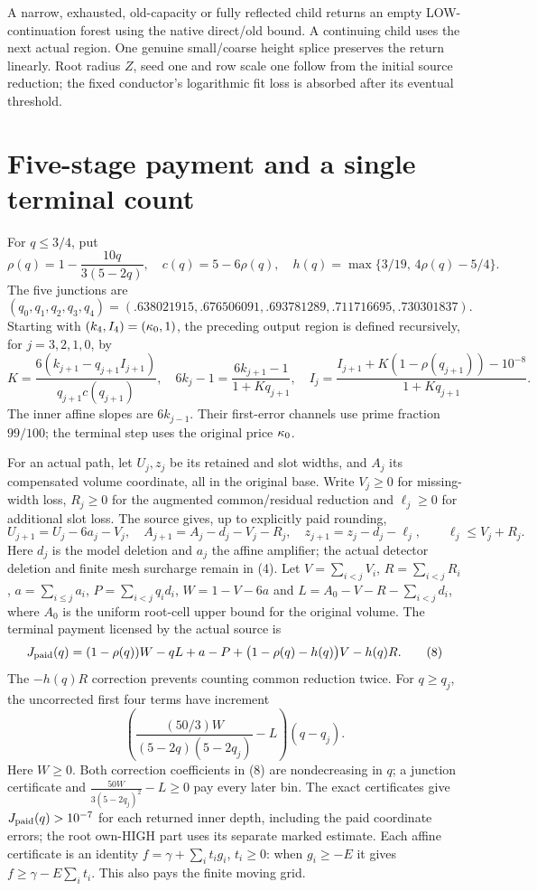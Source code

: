 \documentclass[10pt,a4paper]{article}
\begin{document}
A narrow, exhausted, old-capacity or fully reflected child returns an empty
LOW-continuation forest using the native direct/old bound. A continuing child
uses the next actual region. One genuine small/coarse height splice preserves
the return linearly. Root radius $Z$, seed one and row scale one follow from
the initial source reduction; the fixed conductor's logarithmic fit loss is
absorbed after its eventual threshold.

\newpage
\section{Five-stage payment and a single terminal count}
For $q\le3/4$, put
\[
 \rho(q)=1-\frac{10q}{3(5-2q)},\quad c(q)=5-6\rho(q),\quad
 h(q)=\max\{3/19,\,4\rho(q)-5/4\}.
\]
The five junctions are
\[
 (q_0,q_1,q_2,q_3,q_4)=
 (.638021915,.676506091,.693781289,.711716695,.730301837). \tag{5}
\]
Starting with $(k_4,I_4)=(\kappa_0,1)$, the preceding output region is defined
recursively, for $j=3,2,1,0$, by
\[
 K=\frac{6(k_{j+1}-q_{j+1}I_{j+1})}{q_{j+1}c(q_{j+1})},\quad
 6k_j-1=\frac{6k_{j+1}-1}{1+Kq_{j+1}},\quad
 I_j=\frac{I_{j+1}+K(1-\rho(q_{j+1}))-10^{-8}}{1+Kq_{j+1}}. \tag{6}
\]
The inner affine slopes are $6k_{j-1}$. Their first-error channels use prime
fraction $99/100$; the terminal step uses the original price $\kappa_0$.

For an actual path, let $U_j,z_j$ be its retained and slot widths, and
$A_j$ its compensated volume coordinate, all in the original base. Write $V_j\ge0$ for missing-width loss,
$R_j\ge0$ for the augmented common/residual reduction and $\ell_j\ge0$
for additional slot loss. The source gives, up to explicitly paid rounding,
\[
 U_{j+1}=U_j-6a_j-V_j,\quad A_{j+1}=A_j-d_j-V_j-R_j,\quad
 z_{j+1}=z_j-d_j-\ell_j,\qquad \ell_j\le V_j+R_j.       \tag{7}
\]
Here $d_j$ is the model deletion and $a_j$ the affine amplifier; the actual
detector deletion and finite mesh surcharge remain in (4).
Let $V=\sum_{i<j}V_i$, $R=\sum_{i<j}R_i$,
$a=\sum_{i\le j}a_i$, $P=\sum_{i<j}q_id_i$,
$W=1-V-6a$ and $L=A_0-V-R-\sum_{i<j}d_i$, where $A_0$ is the
uniform root-cell upper bound for the original volume.
The terminal payment licensed by the actual source is
\[
 J_{\rm paid}(q)=(1-\rho(q))W-qL+a-P
          +\bigl(1-\rho(q)-h(q)\bigr)V-h(q)R.           \tag{8}
\]
The $-h(q)R$ correction prevents counting common reduction twice.
For $q\ge q_j$, the uncorrected first four terms have increment
\[
 \left(\frac{(50/3)W}{(5-2q)(5-2q_j)}-L\right)(q-q_j).\tag{9}
\]
Here $W\ge0$. Both correction coefficients in (8) are nondecreasing in $q$;
a junction certificate and $\frac{50W}{3(5-2q_j)^2}-L\ge0$ pay every later bin.
The exact certificates give $J_{\rm paid}(q)>10^{-7}$ for each returned
inner depth, including the paid coordinate errors; the root own-HIGH part
uses its separate marked estimate. Each affine certificate is an
identity $f=\gamma+\sum_i t_i g_i$, $t_i\ge0$: when $g_i\ge-E$ it gives
$f\ge\gamma-E\sum_i t_i$. This also pays the finite moving grid.
\end{document}
